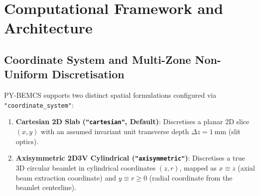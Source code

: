 \documentclass[11pt,a4paper]{article}
\newcommand{\PYBEMCS}{PY-BEMCS}
\begin{document}
\tableofcontents
\newpage

\section{Computational Framework and Architecture}

\subsection{Coordinate System and Multi-Zone Non-Uniform Discretisation}

\PYBEMCS{} supports two distinct spatial formulations configured via \texttt{"coordinate\_system"}:
\begin{enumerate}[nosep]
    \item \textbf{Cartesian 2D Slab (\texttt{"cartesian"}, Default)}: Discretises a planar 2D slice $(x, y)$ with an assumed invariant unit transverse depth $\Delta z = \SI{1}{\milli\meter}$ (slit optics).
    \item \textbf{Axisymmetric 2D3V Cylindrical (\texttt{"axisymmetric"})}: Discretises a true 3D circular beamlet in cylindrical coordinates $(z, r)$, mapped as $x \equiv z$ (axial beam extraction coordinate) and $y \equiv r \ge 0$ (radial coordinate from the beamlet centerline).
\end{enumerate}
\end{document}
